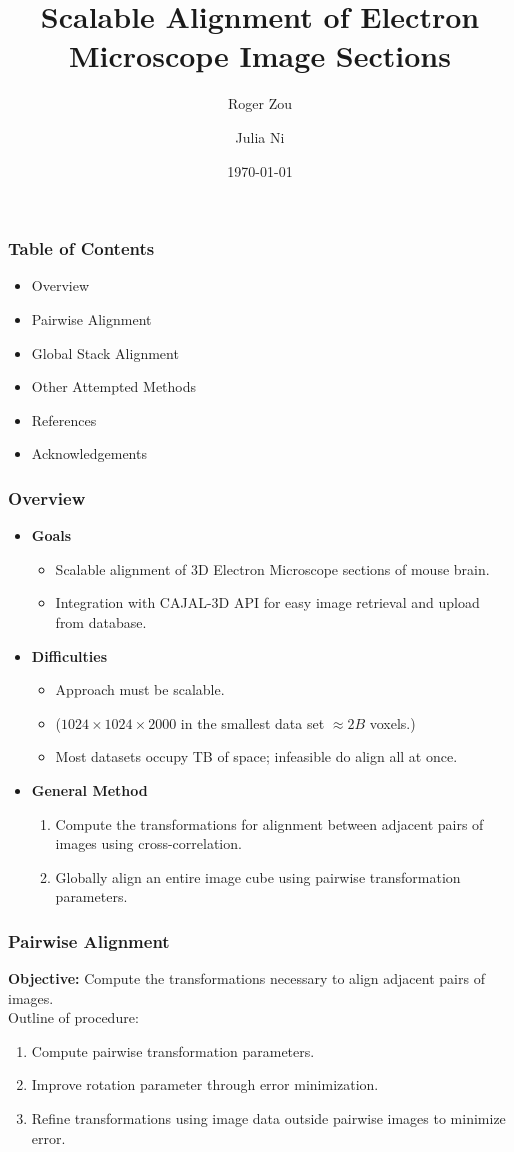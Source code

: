 \documentclass{beamer}
\begin{document}
\title[Scalable EM Alignment]
{Scalable Alignment of Electron Microscope Image Sections}
\author[Zou, Ni] {Roger Zou \and Julia Ni}
\date{\today}

\frame{\titlepage}

\begin{frame}
\frametitle{Table of Contents}
\begin{itemize}
\item Overview
\item Pairwise Alignment
\item Global Stack Alignment
\item Other Attempted Methods
\item References
\item Acknowledgements 
\end{itemize}
\end{frame}

\begin{frame}
\frametitle{Overview}
\begin{itemize}
\item \textbf{Goals}
\begin{itemize}
\item Scalable alignment of 3D Electron Microscope sections of mouse brain.
\item Integration with CAJAL-3D API for easy image retrieval and upload from database.
\end{itemize}
\item \textbf{Difficulties} 
\begin{itemize}
\item Approach must be scalable.
\item ($1024 \times 1024 \times 2000$ in the smallest data set $\approx 2B$ voxels.)
\item Most datasets occupy TB of space; infeasible do align all at once.
\end{itemize}
\item \textbf{General Method}
\begin{enumerate}
\item Compute the transformations for alignment between adjacent pairs of images using cross-correlation.
\item Globally align an entire image cube using pairwise transformation parameters.
\end{enumerate}
\end{itemize}
\end{frame}

\begin{frame}
\frametitle{Pairwise Alignment}
\textbf{Objective:} Compute the transformations necessary to align adjacent pairs of images. \\
Outline of procedure:
\begin{enumerate}
\item Compute pairwise transformation parameters.
\item Improve rotation parameter through error minimization.
\item Refine transformations using image data outside pairwise images to minimize error.
\end{enumerate}
\end{frame}
\end{document}
